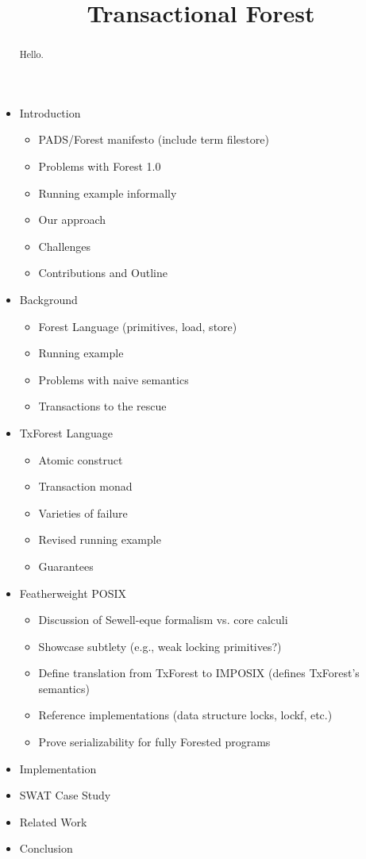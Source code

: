 \documentclass[nocopyrightspace]{sigplanconf}
\title{Transactional Forest}
\begin{document}
\maketitle


\begin{abstract}
Hello.
\end{abstract}

\begin{itemize}
\item Introduction
\begin{itemize}
\item PADS/Forest manifesto  (include term filestore)
\item Problems with Forest 1.0
\item Running example informally
\item Our approach
\item Challenges
\item Contributions and Outline
\end{itemize}
\item Background
\begin{itemize}
\item Forest Language (primitives, load, store)
\item Running example 
\item Problems with naive semantics
\item Transactions to the rescue
\end{itemize}
\item TxForest Language
\begin{itemize}
\item Atomic construct 
\item Transaction monad
\item Varieties of failure
\item Revised running example
\item Guarantees
\end{itemize}
\item Featherweight POSIX
\begin{itemize}
\item Discussion of Sewell-eque formalism vs. core calculi  
\item Showcase subtlety (e.g., weak locking primitives?)
\item Define translation from TxForest to IMPOSIX (defines TxForest's semantics)
\item Reference implementations (data structure locks, lockf, etc.)
\item Prove serializability for fully Forested programs
\end{itemize}
\item Implementation
\item SWAT Case Study
\item Related Work
\item Conclusion
\end{itemize}



 
\balance  

\end{document}
